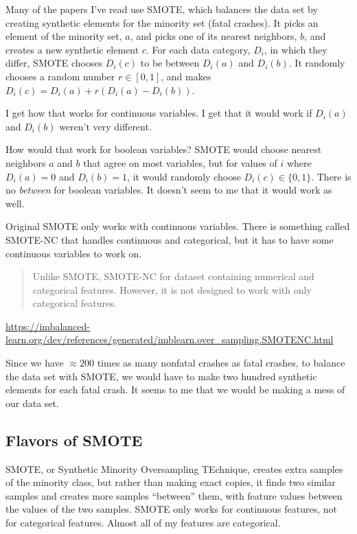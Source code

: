 Many of the papers I've read use SMOTE, which balances the data set by creating synthetic elements for the minority set (fatal crashes).  It picks an element of the minority set, $a$, and picks one of its nearest neighbors, $b$, and creates a new synthetic element $c$.  For each data category, $D_i$, in which they differ, SMOTE chooses $D_i(c)$ to be between $D_i(a)$ and $D_i(b)$.  It randomly chooses a random number $r \in [0,1]$, and makes $D_i(c) = D_i(a) + r(D_i(a) - D_i(b))$.  

I get how that works for continuous variables.  I get that it would work if $D_i(a)$ and $D_i(b)$ weren't very different.  

How would that work for boolean variables?  SMOTE would choose nearest neighbors $a$ and $b$ that agree on most variables, but for values of $i$ where $D_i(a)=0$ and $D_i(b)=1$, it would randomly choose $D_i(c) \in \{0,1\}$.  There is no {\it between} for boolean variables.  It doesn't seem to me that it would work as well.  

Original SMOTE only works with continuous variables.  There is something called SMOTE-NC that handles continuous and categorical, but it has to have some continuous variables to work on.  

\begin{quote}
Unlike SMOTE, SMOTE-NC for dataset containing numerical and categorical features. However, it is not designed to work with only categorical features.
\end{quote}

\url{https://imbalanced-learn.org/dev/references/generated/imblearn.over_sampling.SMOTENC.html}

Since we have $\approx 200$ times as many nonfatal crashes as fatal crashes, to balance the data set with SMOTE, we would have to make two hundred synthetic elements for each fatal crash.  It seems to me that we would be making a mess of our data set.  
		


\subsection{Flavors of SMOTE}

SMOTE, or Synthetic Minority Oversampling TEchnique, 			\cite{CHAWLA_2002}
 creates extra samples of the minority class, but rather than making exact copies, it finds two similar samples and creates more samples ``between'' them, with feature values between the values of the two samples.  SMOTE only works for continuous features, not for categorical features.  Almost all of my features are categorical.  
 
